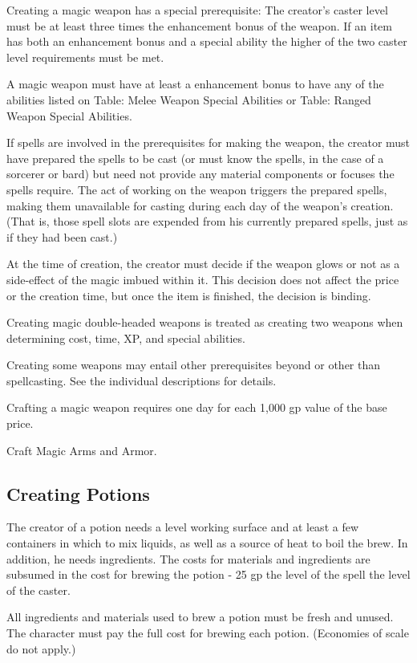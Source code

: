 Creating a magic weapon has a special prerequisite: The creator's caster level must be at least three times the enhancement bonus of the weapon. If an item has both an enhancement bonus and a special ability the higher of the two caster level requirements must be met.

A magic weapon must have at least a  enhancement bonus to have any of the abilities listed on Table: Melee Weapon Special Abilities or Table: Ranged Weapon Special Abilities.

If spells are involved in the prerequisites for making the weapon, the creator must have prepared the spells to be cast (or must know the spells, in the case of a sorcerer or bard) but need not provide any material components or focuses the spells require. The act of working on the weapon triggers the prepared spells, making them unavailable for casting during each day of the weapon's creation. (That is, those spell slots are expended from his currently prepared spells, just as if they had been cast.)

At the time of creation, the creator must decide if the weapon glows or not as a side-effect of the magic imbued within it. This decision does not affect the price or the creation time, but once the item is finished, the decision is binding.

Creating magic double-headed weapons is treated as creating two weapons when determining cost, time, XP, and special abilities.

Creating some weapons may entail other prerequisites beyond or other than spellcasting. See the individual descriptions for details.

Crafting a magic weapon requires one day for each 1,000 gp value of the base price.

 Craft Magic Arms and Armor.

\subsection{Creating Potions}

The creator of a potion needs a level working surface and at least a few containers in which to mix liquids, as well as a source of heat to boil the brew. In addition, he needs ingredients. The costs for materials and ingredients are subsumed in the cost for brewing the potion - 25 gp \mtimes  the level of the spell \mtimes  the level of the caster.

All ingredients and materials used to brew a potion must be fresh and unused. The character must pay the full cost for brewing each potion. (Economies of scale do not apply.)


